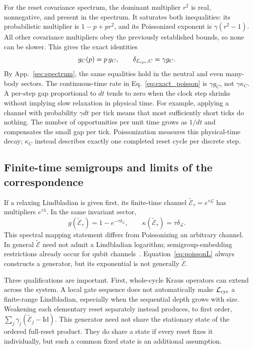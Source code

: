 \documentclass[aps,prb,onecolumn,nofootinbib,superscriptaddress,floatfix]{revtex4-2}
\newcommand{\E}{\widetilde{\mathcal E}}
\begin{document}
For the reset covariance spectrum, the dominant multiplier $r^2$
is real, nonnegative, and present in the spectrum. It saturates
both inequalities: its probabilistic multiplier is
$1-p+pr^2$, and its Poissonized exponent is $\gamma(r^2-1)$.
All other covariance multipliers obey the previously established
bounds, so none can be slower. This gives the exact identities
\begin{equation}
 g_C(p)=p\,g_C,\qquad
 \delta_{\mathcal L_{\rm cyc},C}=\gamma g_C. \label{eq:exact_poisson}
\end{equation}
By App.~\ref{sec:spectrum}, the same equalities hold in the
neutral and even many-body sectors. The continuous-time rate in
Eq.~\eqref{eq:exact_poisson} is $\gamma g_C$, not $\gamma\kappa_C$.
A per-step gap proportional to $dt$ tends to zero when the clock
step shrinks without implying slow relaxation in physical time.
For example, applying a channel with probability $\gamma dt$
per tick means that most sufficiently short ticks do nothing.
The number of opportunities per unit time grows as $1/dt$ and
compensates the small gap per tick. Poissonization measures this
physical-time decay; $\kappa_C$ instead describes exactly one
completed reset cycle per discrete step.

\subsection{Finite-time semigroups and limits of the correspondence}
If a relaxing Lindbladian is given first, its finite-time channel
$\E_\tau=e^{\tau\mathcal L}$ has multipliers $e^{\tau\lambda}$.
In the same invariant sector,
\begin{equation}
 g(\E_\tau)=1-e^{-\tau\delta_{\mathcal L}},\qquad
 \kappa(\E_\tau)=\tau\delta_{\mathcal L}. \label{eq:semigroup}
\end{equation}
This spectral mapping statement differs from Poissonizing an
arbitrary channel. In general $\E$ need not admit a Lindbladian
logarithm; semigroup-embedding restrictions already occur for
qubit channels~\cite{PRZ}. Equation~\eqref{eq:poissonL} always
constructs a generator, but its exponential is not generally $\E$.

Three qualifications are important. First, whole-cycle Kraus
operators can extend across the system. A local gate sequence does
not automatically make $\mathcal L_{\rm cyc}$ a finite-range
Lindbladian, especially when the sequential depth grows with size.
Weakening each elementary reset separately instead produces, to
first order, $\sum_j\gamma_j(\E_j-\mathrm{Id})$. This generator
need not share the stationary state of the ordered full-reset
product. They do share a state if every reset fixes it individually,
but such a common fixed state is an additional assumption.
\end{document}
